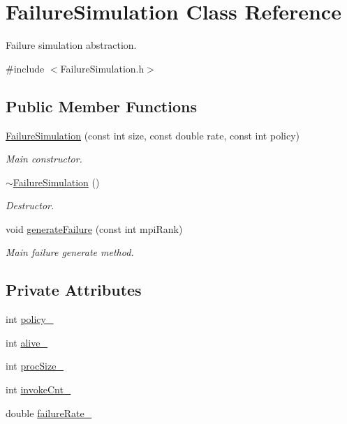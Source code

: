 \hypertarget{classFailureSimulation}{}\section{Failure\+Simulation Class Reference}
\label{classFailureSimulation}


Failure simulation abstraction.  




{\ttfamily \#include $<$Failure\+Simulation.\+h$>$}

\subsection*{Public Member Functions}
\begin{DoxyCompactItemize}
\item 
\hyperlink{classFailureSimulation_a276f5e62633c5b27dbafc77f611de2f1}{Failure\+Simulation} (const int size, const double rate, const int policy)
\begin{DoxyCompactList}\small\item\em Main constructor. \end{DoxyCompactList}\item 
\hyperlink{classFailureSimulation_a182f88052d30fad7b4e839f9fe6023fe}{$\sim$\+Failure\+Simulation} ()\hypertarget{classFailureSimulation_a182f88052d30fad7b4e839f9fe6023fe}{}\label{classFailureSimulation_a182f88052d30fad7b4e839f9fe6023fe}

\begin{DoxyCompactList}\small\item\em Destructor. \end{DoxyCompactList}\item 
void \hyperlink{classFailureSimulation_aa20776c9bdcbce6654246221f8fd0d1a}{generate\+Failure} (const int mpi\+Rank)
\begin{DoxyCompactList}\small\item\em Main failure generate method. \end{DoxyCompactList}\end{DoxyCompactItemize}
\subsection*{Private Attributes}
\begin{DoxyCompactItemize}
\item 
int \hyperlink{classFailureSimulation_a59f1e391b8056b83f2bde5450d3f95c2}{policy\+\_\+}
\item 
int \hyperlink{classFailureSimulation_af6c72fef61f03896df170bf262cab03e}{alive\+\_\+}
\item 
int \hyperlink{classFailureSimulation_a1f1cd48b5fe41eed41be69c20d6fe150}{proc\+Size\+\_\+}
\item 
int \hyperlink{classFailureSimulation_aefff5ead95ce91fc60cb8a814aa1ea06}{invoke\+Cnt\+\_\+}
\item 
double \hyperlink{classFailureSimulation_ad7db683f7b53f7ae2907aa2299bf30cd}{failure\+Rate\+\_\+}
\end{DoxyCompactItemize}


